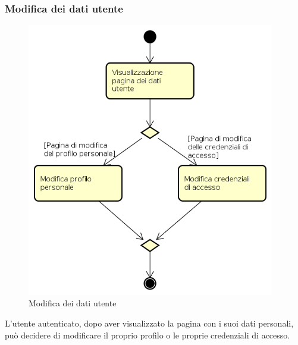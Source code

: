 \subsubsection{Modifica dei dati utente}
\begin{figure}[H]
\begin{center}
\includegraphics[height=12cm]{res/sections/backend/activities/modificaDati.png}
\caption{Modifica dei dati utente}
\end{center}
\end{figure}
L'utente autenticato, dopo aver visualizzato la pagina con i suoi dati personali, può decidere di modificare il proprio profilo o le proprie credenziali di accesso.
